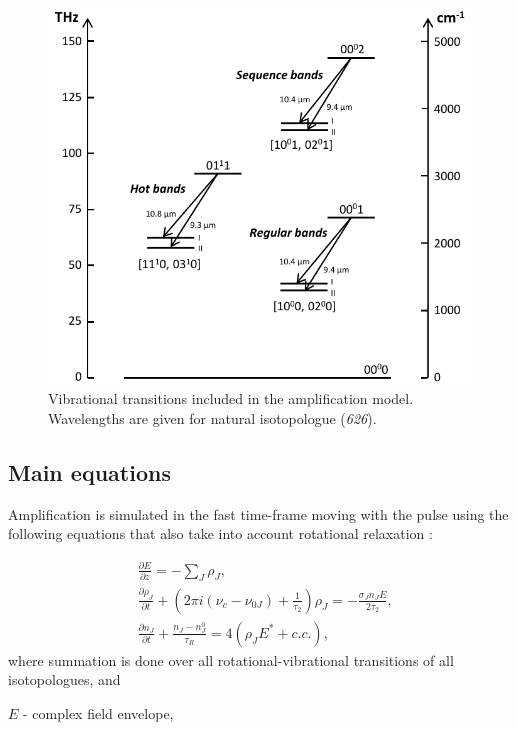 \documentclass{report}
\begin{document}
\begin{figure}[ht]
\centering
\includegraphics[width=120mm]{images/laser-transitions}
\caption{Vibrational transitions included in the amplification model. Wavelengths are given for natural  isotopologue (\textit{626}).}\label{fig:laser-transitions}
\end{figure}

\subsection{Main equations}
Amplification is simulated in the fast time-frame moving with the pulse using the following equations that also take into account rotational relaxation \cite{Feldman-1973,Volkin-1979}:

\begin{equation}\label{eq:amplification}
\begin{aligned}
&\frac{\partial E}{\partial z} =  - \sum\limits_J {\rho _J},\\
&\frac{\partial \rho _J}{\partial t} + \left(2\pi i(\nu _c-\nu _{0J}) + \frac{1}{\tau_2} \right)\rho _J =  - \frac{\sigma _J n_J E}{2\tau_2},\\
&\frac{\partial n_J}{\partial t} + \frac{n_J-n_J^0}{\tau _R} = 4(\rho _J E^* + c.c.),
\end{aligned}
\end{equation}
where summation is done over all rotational-vibrational transitions of all  isotopologues, and

$E$ - complex field envelope,
\end{document}
